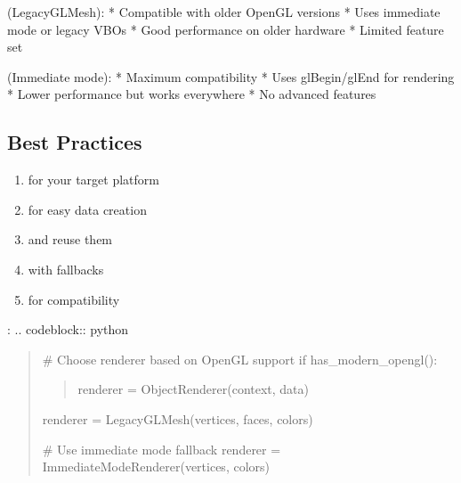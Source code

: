 \documentclass[a4paper,10pt,english,openany,oneside]{sphinxmanual}
\begin{document}
\sphinxAtStartPar
{} (LegacyGLMesh):
* Compatible with older OpenGL versions
* Uses immediate mode or legacy VBOs
* Good performance on older hardware
* Limited feature set

\sphinxAtStartPar
{} (Immediate mode):
* Maximum compatibility
* Uses glBegin/glEnd for rendering
* Lower performance but works everywhere
* No advanced features


\subsection{Best Practices}
\label{\detokenize{api/renderer:best-practices}}\begin{enumerate}
%
\item {} 
\sphinxAtStartPar
{} for your target platform

\item {} 
\sphinxAtStartPar
{} for easy data creation

\item {} 
\sphinxAtStartPar
{} and reuse them

\item {} 
\sphinxAtStartPar
{} with fallbacks

\item {} 
\sphinxAtStartPar
{} for compatibility

\end{enumerate}

\sphinxAtStartPar
{}:
.. code\sphinxhyphen{}block:: python
\begin{quote}

\sphinxAtStartPar
\# Choose renderer based on OpenGL support
if has\_modern\_opengl():
\begin{quote}

\sphinxAtStartPar
renderer = ObjectRenderer(context, data)
\end{quote}
\begin{description}
\sphinxAtStartPar
renderer = LegacyGLMesh(vertices, faces, colors)

\sphinxAtStartPar
\# Use immediate mode fallback
renderer = ImmediateModeRenderer(vertices, colors)

\end{description}
\end{quote}
\end{document}
